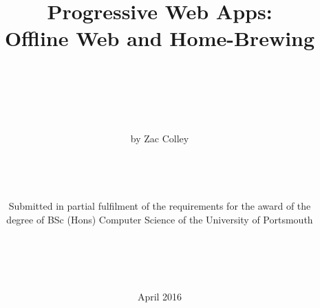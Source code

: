 \title{\bfseries Progressive Web Apps:\\Offline Web and Home-Brewing}
\author{\\\\\\\\\\by Zac Colley\\\\\\\\\\Submitted in partial fulfilment of the requirements for the award of the\\ degree of BSc (Hons) Computer Science of the University of Portsmouth\\\\\\\\\\}
\date{April 2016}
